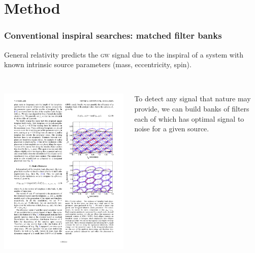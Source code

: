 \documentclass{beamer}
\begin{document}
\section{Method}

\begin{frame}
	\frametitle{Conventional inspiral searches: matched filter banks}
	General relativity predicts the \textsc{gw} signal due to the inspiral of a system with known intrinsic source parameters (mass, eccentricity, spin).
	\\~\\

	\begin{columns}
		\begin{column}{0.5\textwidth}
			\includegraphics[width=\textwidth]{figures/hexgrid}
		\end{column}
		\begin{column}{0.5\textwidth}
			To detect any signal that nature may provide, we can build banks of filters each of which has optimal signal to noise for a given source. \\~\\


\end{column}
\end{columns}
\end{frame}
\end{document}
